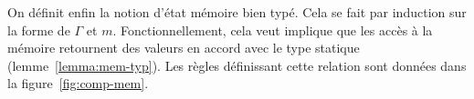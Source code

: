 







On définit enfin la notion d'état mémoire bien typé. Cela se fait par induction
sur la forme de $Γ$ et $m$. Fonctionnellement, cela veut implique que les accès
à la mémoire retournent des valeurs en accord avec le type statique
(lemme~\ref{lemma:mem-typ}). Les règles définissant cette relation sont données
dans la figure~\ref{fig:comp-mem}.

